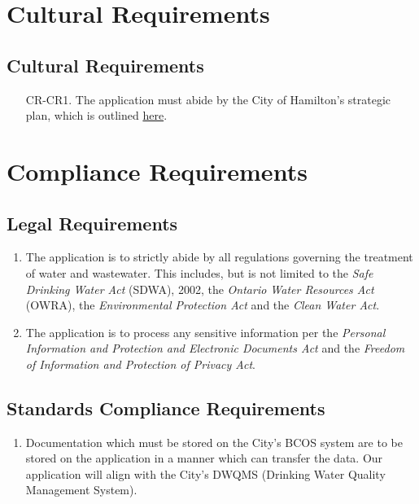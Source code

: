 \documentclass[12pt]{article}
\begin{document}
\section{Cultural Requirements}
\subsection{Cultural Requirements}
\begin{enumerate}[{CR-CR}1.]
  \item[CR-CR1.] The application must abide by the City of Hamilton's
    strategic plan, which is outlined
    \href{https://www.hamilton.ca/city-council/plans-strategies/strategies/2016-2025-strategic-plan}{here}.
\end{enumerate}

\section{Compliance Requirements}
\subsection{Legal Requirements}
\begin{enumerate}[{CR-L}1.]
  \item The application is to strictly abide by all regulations governing
    the treatment of water and wastewater. This includes, but is not limited
    to the \textit{Safe Drinking Water Act} (SDWA), 2002, the
    \textit{Ontario Water Resources Act} (OWRA), the
    \textit{Environmental Protection Act} and the \textit{Clean Water Act}.\\
  \item The application is to process any sensitive information per the
    \textit{Personal Information and Protection and Electronic
    Documents Act} and
    the \textit{Freedom of Information and Protection of Privacy Act}.
\end{enumerate}
\subsection{Standards Compliance Requirements}
\begin{enumerate}[{CR-S}1.]
  \item Documentation which must be stored on the City's BCOS
    system are to be stored on the application in a manner which can
    transfer the data. Our application will align with the City's
    DWQMS (Drinking Water Quality Management System).
\end{enumerate}
\end{document}

